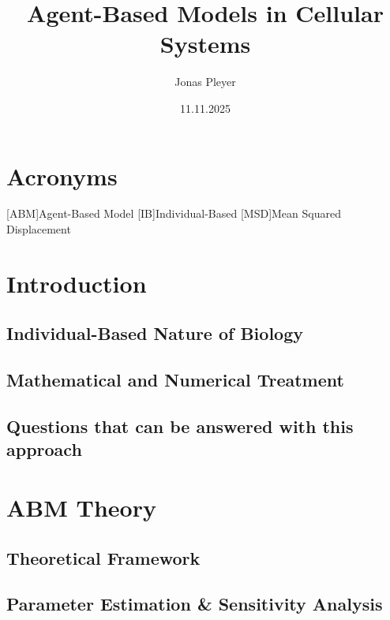 \documentclass[a4paper]{article}
\title{Agent-Based Models in Cellular Systems}\let\Title\@title
\author{Jonas Pleyer}\let\Author\@author
\date{11.11.2025}\let\Date\@date
\begin{document}



\begin{abstract}
\end{abstract}

\newpage
\tableofcontents
{}
\newpage

\listoffigures
\listoftables
\lstlistoflistings

\section*{Acronyms}
\begin{acronym}
    [ABM]{Agent-Based Model}
    [IB]{Individual-Based}
    [MSD]{Mean Squared Displacement}
\end{acronym}


\newpage
{}
\section{Introduction}
\subsection{Individual-Based Nature of Biology}
\subsection{Mathematical and Numerical Treatment}
\subsection{Questions that can be answered with this approach}

\pagebreak
\section{ABM Theory}
\subsection{Theoretical Framework}
\subsection{Parameter Estimation \& Sensitivity Analysis}
\end{document}
